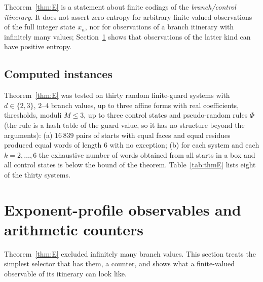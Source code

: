 \begin{remark}[Scope]\label{rem:scope}
Theorem~\ref{thm:E} is a statement about finite codings of the \emph{branch/control itinerary}. It does not assert zero entropy for arbitrary finite-valued observations of the full integer state $x_n$, nor for observations of a branch itinerary with infinitely many values; Section~\ref{sec:order} shows that observations of the latter kind can have positive entropy.
\end{remark}

\subsection{Computed instances}
Theorem~\ref{thm:E} was tested on thirty random finite-guard systems with $d\in\{2,3\}$, $2$--$4$ branch values, up to three affine forms with real coefficients, thresholds, moduli $M\le3$, up to three control states and pseudo-random rules $\Phi$ (the rule is a hash table of the guard value, so it has no structure beyond the arguments): (a) $16\,839$ pairs of starts with equal faces and equal residues produced equal words of length $6$ with no exception; (b) for each system and each $k=2,\dots,6$ the exhaustive number of words obtained from all starts in a box and all control states is below the bound of the theorem. Table~\ref{tab:thmE} lists eight of the thirty systems.
\begin{table}[ht]\centering\small

\caption{Computed words of length $6$ over all starts in a box versus the bound of Theorem~\ref{thm:E} (first eight of thirty systems; $d$ primes, $\nu$ branches, $|Q|$ control states, modulus $M$).}\label{tab:thmE}\end{table}

\section{Exponent-profile observables and arithmetic counters}\label{sec:order}
Theorem~\ref{thm:E} excluded infinitely many branch values. This section treats the simplest selector that has them, a counter, and shows what a finite-valued observable of its itinerary can look like.

